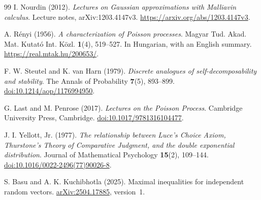 \documentclass[11pt,letterpaper]{article}
\theoremstyle{remark}
\begin{document}
\begin{thebibliography}{99}
I. Nourdin (2012).
\emph{Lectures on Gaussian approximations with Malliavin calculus}.
Lecture notes, arXiv:1203.4147v3.
\url{https://arxiv.org/abs/1203.4147v3}.

A. R\'enyi (1956).
\emph{A characterization of Poisson processes}.
Magyar Tud. Akad. Mat. Kutat\'o Int. K\"ozl. \textbf{1}(4), 519--527.
In Hungarian, with an English summary.
\url{https://real.mtak.hu/200653/}.

F. W. Steutel and K. van Harn (1979).
\emph{Discrete analogues of self-decomposability and stability}.
The Annals of Probability \textbf{7}(5), 893--899.
\href{https://doi.org/10.1214/aop/1176994950}{doi:10.1214/aop/1176994950}.

G. Last and M. Penrose (2017).
\emph{Lectures on the Poisson Process}.
Cambridge University Press, Cambridge.
\href{https://doi.org/10.1017/9781316104477}{doi:10.1017/9781316104477}.

J. I. Yellott, Jr. (1977).
\emph{The relationship between Luce's Choice Axiom, Thurstone's Theory
of Comparative Judgment, and the double exponential distribution}.
Journal of Mathematical Psychology \textbf{15}(2), 109--144.
\href{https://doi.org/10.1016/0022-2496(77)90026-8}{doi:10.1016/0022-2496(77)90026-8}.

S. Basu and A. K. Kuchibhotla (2025).
Maximal inequalities for independent random vectors.
\href{https://arxiv.org/abs/2504.17885}{arXiv:2504.17885}, version~1.

\end{thebibliography}

\clearpage
\appendix
{}
\end{document}
